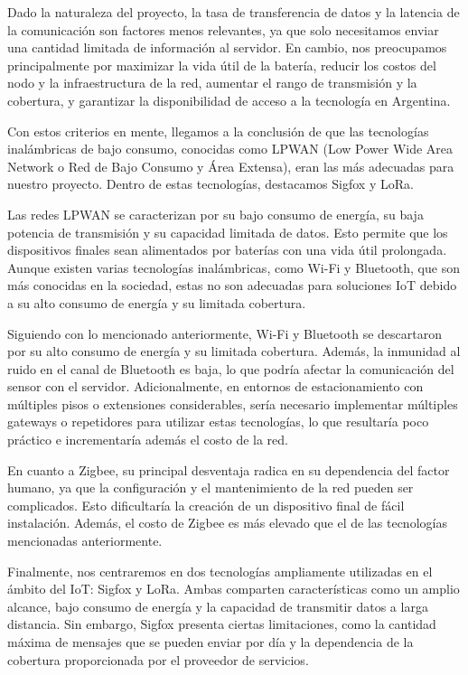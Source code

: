 Dado la naturaleza del proyecto, la tasa de transferencia de datos y la latencia de la comunicación son factores menos relevantes, ya que solo necesitamos enviar una cantidad limitada de información al servidor. En cambio, nos preocupamos principalmente por maximizar la vida útil de la batería, reducir los costos del nodo y la infraestructura de la red, aumentar el rango de transmisión y la cobertura, y garantizar la disponibilidad de acceso a la tecnología en Argentina.

Con estos criterios en mente, llegamos a la conclusión de que las tecnologías inalámbricas de bajo consumo, conocidas como LPWAN (Low Power Wide Area Network o Red de Bajo Consumo y Área Extensa), eran las más adecuadas para nuestro proyecto. Dentro de estas tecnologías, destacamos Sigfox y LoRa.

Las redes LPWAN se caracterizan por su bajo consumo de energía, su baja potencia de transmisión y su capacidad limitada de datos. Esto permite que los dispositivos finales sean alimentados por baterías con una vida útil prolongada. Aunque existen varias tecnologías inalámbricas, como Wi-Fi y Bluetooth, que son más conocidas en la sociedad, estas no son adecuadas para soluciones IoT debido a su alto consumo de energía y su limitada cobertura.

Siguiendo con lo mencionado anteriormente, Wi-Fi y Bluetooth se descartaron por su alto consumo de energía y su limitada cobertura. Además, la inmunidad al ruido en el canal de Bluetooth es baja, lo que podría afectar la comunicación del sensor con el servidor. Adicionalmente, en entornos de estacionamiento con múltiples pisos o extensiones considerables, sería necesario implementar múltiples gateways o repetidores para utilizar estas tecnologías, lo que resultaría poco práctico e incrementaría además el costo de la red.

En cuanto a Zigbee, su principal desventaja radica en su dependencia del factor humano, ya que la configuración y el mantenimiento de la red pueden ser complicados. Esto dificultaría la creación de un dispositivo final de fácil instalación. Además, el costo de Zigbee es más elevado que el de las tecnologías mencionadas anteriormente.

Finalmente, nos centraremos en dos tecnologías ampliamente utilizadas en el ámbito del IoT: Sigfox y LoRa. Ambas comparten características como un amplio alcance, bajo consumo de energía y la capacidad de transmitir datos a larga distancia. Sin embargo, Sigfox presenta ciertas limitaciones, como la cantidad máxima de mensajes que se pueden enviar por día y la dependencia de la cobertura proporcionada por el proveedor de servicios.

